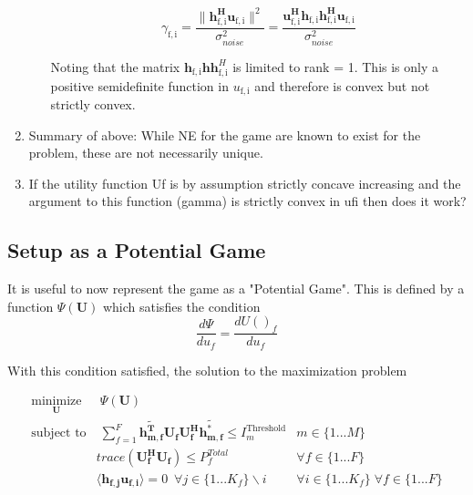 \documentclass[12pt]{article}
\begin{document}
\begin{enumerate}
\begin{itemize}
	\begin{equation}\label{zf_snr_expanded}
	\gamma_{\mathrm{f,i}} = \frac{\|\mathbf{h^H_{\mathrm{f,i}}u_{\mathrm{f,i}}}\|^2}
	{\sigma^2_{noise}  
	}
	= 
	\frac{\mathbf{u^H_{\mathrm{f,i}}h_{\mathrm{f,i}}h^H_{\mathrm{f,i}}u_{\mathrm{f,i}}}}
	{\sigma^2_{noise}  
	}
	\end{equation}
	
	Noting that the matrix 
	$\mathbf{h}_{\mathrm{f,i}}\mathbf{hh}^H_{\mathrm{f,i}}$
	is limited to rank = 1. This is only a positive semidefinite function in 
	$u_{\mathrm{f,i}}$ and therefore is convex but not strictly convex.


\end{itemize}


\item
Summary of above: 
While NE for the game are known to exist for the problem, these are not necessarily unique. 
\item 
If the utility function Uf is by assumption strictly concave increasing  and the argument to this function (gamma) is strictly convex in ufi then does it work?

\end{enumerate}





\subsection{Setup as a Potential Game}
It is useful to now represent the game as a "Potential Game". This is defined by a function
$ \Psi(\mathbf{U})$ which satisfies the condition
\begin{equation}\label{potential_game_condition}
\frac{d\Psi}{du_f} = \frac{d U()_f}{du_f}
\end{equation}


With this condition satisfied, the solution to the maximization problem 

\begin{subequations}
	\label{optim}
	\begin{align}
	    \underset{\mathbf{U}}{\text{minimize}}
	    & \; \Psi(\mathbf{U}) \label{potential_game} 
	    \\
	    \text{subject to}  & \;
	    \sum^F_{f=1}\mathbf{\tilde{h_{m,f}^T}}  \mathbf{U_f}  \mathbf{U_f^H}
		\mathbf{\tilde{h_{m,f}^*}} \leq I^{\mathrm{Threshold}}_{m} & m \in \{1 ...M\} 
		\label{interference_const_central}\\
        & trace(\mathbf{U_f^H}\mathbf{U_f}) \leq P^{Total}_{f} & \forall f \in \{1 ... F\}
        \label{power_const_central}\\
        & \langle \mathbf{h_{f,j}}\mathbf{u_{f,i}} \rangle =0\ \; \forall j \in \{1... K_f\}				\backslash i &\forall i \in \{1 ... K_f\}\; \forall f \in \{1 ... F\} \label{zf_const_central}
	\end{align}
	\end{subequations}
\end{document}
